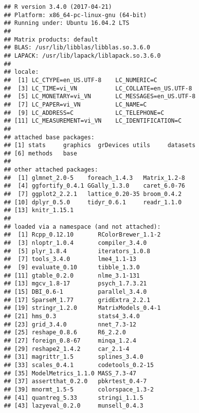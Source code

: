 \documentclass[a4paper]{report}\usepackage[]{graphicx}\usepackage[]{color}
\makeatletter
\newenvironment{kframe}{%
 \def\at@end@of@kframe{}%
 \ifinner\ifhmode%
  \def\at@end@of@kframe{\end{minipage}}%
  \begin{minipage}{\columnwidth}%
 \fi\fi%
 \def\FrameCommand##1{\hskip\@totalleftmargin \hskip-\fboxsep
 \colorbox{shadecolor}{##1}\hskip-\fboxsep
     \hskip-\linewidth \hskip-\@totalleftmargin \hskip\columnwidth}%
 \MakeFramed {\advance\hsize-\width
   \@totalleftmargin\z@ \linewidth\hsize
   \@setminipage}}%
 {\par\unskip\endMakeFramed%
 \at@end@of@kframe}
\newenvironment{knitrout}{}{} %
\makeatother
\begin{document}
\begin{knitrout}\small
{}\color{fgcolor}\begin{kframe}
\begin{verbatim}
## R version 3.4.0 (2017-04-21)
## Platform: x86_64-pc-linux-gnu (64-bit)
## Running under: Ubuntu 16.04.2 LTS
## 
## Matrix products: default
## BLAS: /usr/lib/libblas/libblas.so.3.6.0
## LAPACK: /usr/lib/lapack/liblapack.so.3.6.0
## 
## locale:
##  [1] LC_CTYPE=en_US.UTF-8    LC_NUMERIC=C           
##  [3] LC_TIME=vi_VN           LC_COLLATE=en_US.UTF-8 
##  [5] LC_MONETARY=vi_VN       LC_MESSAGES=en_US.UTF-8
##  [7] LC_PAPER=vi_VN          LC_NAME=C              
##  [9] LC_ADDRESS=C            LC_TELEPHONE=C         
## [11] LC_MEASUREMENT=vi_VN    LC_IDENTIFICATION=C    
## 
## attached base packages:
## [1] stats     graphics  grDevices utils     datasets 
## [6] methods   base     
## 
## other attached packages:
##  [1] glmnet_2.0-5    foreach_1.4.3   Matrix_1.2-8   
##  [4] ggfortify_0.4.1 GGally_1.3.0    caret_6.0-76   
##  [7] ggplot2_2.2.1   lattice_0.20-35 broom_0.4.2    
## [10] dplyr_0.5.0     tidyr_0.6.1     readr_1.1.0    
## [13] knitr_1.15.1   
## 
## loaded via a namespace (and not attached):
##  [1] Rcpp_0.12.10       RColorBrewer_1.1-2
##  [3] nloptr_1.0.4       compiler_3.4.0    
##  [5] plyr_1.8.4         iterators_1.0.8   
##  [7] tools_3.4.0        lme4_1.1-13       
##  [9] evaluate_0.10      tibble_1.3.0      
## [11] gtable_0.2.0       nlme_3.1-131      
## [13] mgcv_1.8-17        psych_1.7.3.21    
## [15] DBI_0.6-1          parallel_3.4.0    
## [17] SparseM_1.77       gridExtra_2.2.1   
## [19] stringr_1.2.0      MatrixModels_0.4-1
## [21] hms_0.3            stats4_3.4.0      
## [23] grid_3.4.0         nnet_7.3-12       
## [25] reshape_0.8.6      R6_2.2.0          
## [27] foreign_0.8-67     minqa_1.2.4       
## [29] reshape2_1.4.2     car_2.1-4         
## [31] magrittr_1.5       splines_3.4.0     
## [33] scales_0.4.1       codetools_0.2-15  
## [35] ModelMetrics_1.1.0 MASS_7.3-47       
## [37] assertthat_0.2.0   pbkrtest_0.4-7    
## [39] mnormt_1.5-5       colorspace_1.3-2  
## [41] quantreg_5.33      stringi_1.1.5     
## [43] lazyeval_0.2.0     munsell_0.4.3
\end{verbatim}
\end{kframe}
\end{knitrout}





\printbibliography
{}
\end{document}
